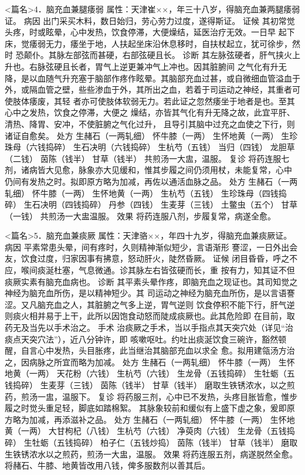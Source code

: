 \documentclass[a4paper,12pt,UTF8,twoside]{ctexbook}
\begin{document}
<篇名>4．脑充血兼腿痿弱
属性：天津崔××，年三十八岁，得脑充血兼两腿痿弱证。 
病因 出门采买木料，数日始归，劳心劳力过度，遂得斯证。 
证候 其初常觉头疼，时或眩晕，心中发热，饮食停滞，大便燥结，延医治疗无效。一日早 
起下床，觉痿弱无力，痿坐于地，人扶起坐床沿休息移时，自扶杖起立，犹可徐步，然时 
恐颠仆。其脉左部弦而甚硬，右部弦硬且长。 
诊断 其左脉弦硬者，肝气挟火上升也。右脉弦硬且长者，胃气上逆更兼冲气上冲也。因其脏腑间 
之气化有升无降，是以血随气升充塞于脑部作疼作眩晕。其脑部充血过甚，或自微细血管溢血于 
外，或隔血管之壁，些些渗血于外，其所出之血，若着于司运动之神经，其重者可使肢体痿废，其轻 
者亦可使肢体软弱无力。若此证之忽然痿坐于地者是也。至其心中之发热，饮食之停滞，大便之 
燥结，亦皆其气化有升无降之故，此宜平肝、清热、降胃、安冲，不使脏腑之气化过升， 
且导引其脑中过充之血使之下行，则诸证自愈矣。 
处方 生赭石（一两轧细） 怀牛膝（一两） 生怀地黄（一两） 生珍珠母（六钱捣碎） 
生石决明（六钱捣碎） 生杭芍（五钱） 当归（四钱） 龙胆草（二钱） 
茵陈（钱半） 甘草（钱半） 
共煎汤一大盅，温服。 
复诊 将药连服七剂，诸病皆大见愈，脉象亦大见缓和，惟其步履之间仍须用杖，未能复常，心中 
仍间有发热之时。拟即原方略为加减，再佐以通活血脉之品。 
处方 生赭石（一两轧细） 怀牛膝（一两） 生怀地黄（一两） 生杭芍（五钱） 
生珍珠母（四钱捣碎） 生石决明（四钱捣碎） 丹参（四钱） 生麦芽（三钱） 
土鳖虫（五个） 甘草（一钱） 
共煎汤一大盅温服。 
效果 将药连服八剂，步履复常，病遂全愈。 


<篇名>5．脑充血兼痰厥
属性：天津骆××，年四十九岁，得脑充血兼痰厥证。 
病因 平素常患头晕，间有疼时，久则精神渐似短少，言语渐形 
謇涩，一日外出会友，饮食过度，归家因事有拂意，怒动肝火，陡然昏厥。 
证候 闭目昏昏，呼之不应，喉间痰涎杜塞，气息微通。诊其脉左右皆弦硬而长，重 
按有力，知其证不但痰厥实素有脑充血病也。 
诊断 其平素头晕作疼，即脑充血之现证也。其司知觉之神经为脑充血所伤，是以精神短少。其 
司运动之神经为脑充血所伤，是以言语謇涩。又凡脑充血之人，其脏腑之气多上逆，胃气逆则 
饮食停积不能下行，肝气逆则痰火相并易于上干，此所以因饱食动怒而陡成痰厥也。此其危险即 
在目前，取药无及当先以手术治之。 
手术 治痰厥之手术，当以手指点其天突穴处（详见“治痰点天突穴法”），近八分钟许，即 
咳嗽呕吐。约吐出痰涎饮食三碗许，豁然顿醒，自言心中发热，头目胀疼，此当继治其脑部充血以求全 
愈。拟用建瓴汤方治之，因病脉之所宜而略为加减。 
处方 生赭石（一两轧细） 怀牛膝（一两） 生怀地黄（一两） 天花粉（六钱） 
生杭芍（六钱） 生龙骨（五钱捣碎） 生牡蛎（五钱捣碎） 生麦芽（三钱） 
茵陈（钱半） 甘草（钱半） 
磨取生铁锈浓水，以之煎药，煎汤一盅，温服下。 
复诊 将药服三剂，心中已不发热，头疼目胀皆愈，惟步履之时觉头重足轻，脚底如踏棉絮。 
其脉象较前和缓似有上盛下虚之象，爰即原方略为加减，再添滋补之品。 
处方 生赭石（一两轧细） 怀牛膝（一两） 生怀地黄（一两） 大甘枸杞（八钱） 
生杭芍（六钱） 净萸肉（六钱） 生龙骨（五钱捣碎） 生牡蛎（五钱捣碎） 
柏子仁（五钱炒捣） 茵陈（钱半） 甘草（钱半） 
磨取生铁锈浓水以之煎药，煎汤一大盅，温服。 
效果 将药连服五剂，病遂脱然全愈。将赭石、牛膝、地黄皆改用八钱，俾多服数剂以善其后。 
\end{document}
